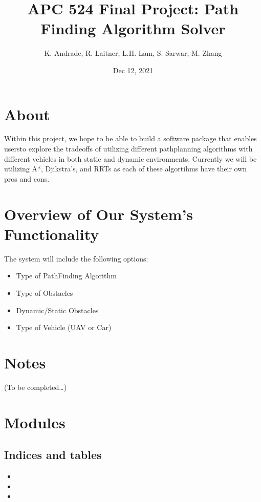 \documentclass[letterpaper,10pt,english]{sphinxmanual}
\title{APC 524 Final Project: Path Finding Algorithm Solver}
\date{Dec 12, 2021}
\author{K.\@{} Andrade, R.\@{} Laitner, L.H.\@{} Lam, S.\@{} Sarwar, M.\@{} Zhang}
\begin{document}
\pagestyle{empty}
\sphinxmaketitle
\pagestyle{plain}
\sphinxtableofcontents
\pagestyle{normal}
\label{\detokenize{index::doc}}



\chapter{About}
\label{\detokenize{index:about}}
\sphinxAtStartPar
Within this project, we hope to be able to build a software package that enables
usersto explore the tradeoffs of utilizing different path\sphinxhyphen{}planning algorithms
with different vehicles in both static and dynamic environments. Currently we will
be utilizing A*, Djikstra’s, and RRTs as each of these algortihms have their own
pros and cons.


\chapter{Overview of Our System’s Functionality}
\label{\detokenize{index:overview-of-our-system-s-functionality}}
\sphinxAtStartPar
The system will include the following options:
\begin{itemize}
\item {} 
\sphinxAtStartPar
Type of Path\sphinxhyphen{}Finding Algorithm

\item {} 
\sphinxAtStartPar
Type of Obstacles

\item {} 
\sphinxAtStartPar
Dynamic/Static Obstacles

\item {} 
\sphinxAtStartPar
Type of Vehicle (UAV or Car)

\end{itemize}


\chapter{Notes}
\label{\detokenize{index:notes}}
\sphinxAtStartPar
(To be completed…)


\chapter{Modules}
\label{\detokenize{index:modules}}

\section{Indices and tables}
\label{\detokenize{index:indices-and-tables}}\begin{itemize}
\item {} 
\sphinxAtStartPar
{}

\item {} 
\sphinxAtStartPar
{}

\item {} 
\sphinxAtStartPar
{}

\end{itemize}



\renewcommand{\indexname}{Index}
\printindex
\end{document}

